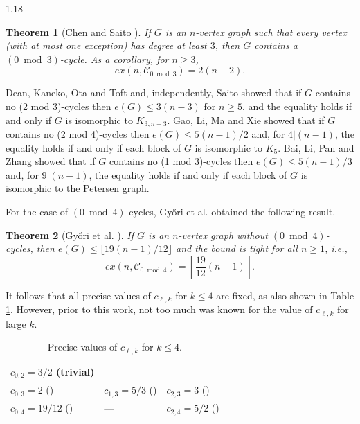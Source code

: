 \documentclass[10pt]{article}
\newtheorem{theorem}{Theorem}[section]
\begin{document}
\begin{spacing}{1.18}
\begin{theorem}[Chen and Saito \cite{CS94}]\label{thm: 0 mod 3}
   If $G$ is an $n$-vertex graph such that every vertex (with at most one exception) has degree at least $3$, then $G$ contains a $(0\bmod 3)$-cycle. As a corollary, for $n \geqslant 3$,
   \[
   ex(n,\mathcal{C}_{0\bmod 3})=2(n-2).
   \]
\end{theorem}

    Dean, Kaneko, Ota and Toft \cite{D+91} and, independently, Saito \cite{Sai92} showed that if $G$ contains no (2 mod 3)-cycles then $e(G)\leqslant 3(n-3)$ for $n\geqslant 5$, and the equality holds if and only if $G$ is isomorphic to $K_{3,n-3}$. Gao, Li, Ma and Xie \cite{GLMX} showed that if $G$ contains no (2 mod 4)-cycles then $e(G)\leqslant 5(n-1)/2$ and, for $4|(n-1)$, the equality holds if and only if each block of $G$ is isomorphic to $K_5$. Bai, Li, Pan and Zhang \cite{B+25} showed that if $G$ contains no (1 mod 3)-cycles then $e(G)\leqslant 5(n-1)/3$ and, for $9|(n-1)$, the equality holds if and only if each block of $G$ is isomorphic to the Petersen graph.

    For the case of $(0\bmod 4)$-cycles, Gy\H{o}ri et al. \cite{G+23} obtained the following result.  

\begin{theorem}[Gy\H{o}ri et al. \cite{G+23}]\label{thm: 0 mod 4}
    If $G$ is an $n$-vertex graph without $(0 \bmod 4)$-cycles, then $e(G)\leqslant \lfloor19(n-1)/12\rfloor$ and the bound is tight for all $n\geqslant 1$, i.e., 
    \[
     ex(n,\mathcal{C}_{0\bmod 4})=\left\lfloor\frac{19}{12}(n-1)\right\rfloor.
    \]  
\end{theorem}

It follows that all precise values of $c_{\ell,k}$ for $k\leqslant 4$ are fixed, as also shown in Table \ref{tab:clk}. However, prior to this work, not too much was known for the value of $c_{\ell,k}$ for large $k$. 

\begin{table}[ht]
    \renewcommand{\arraystretch}{1.5}
	\centering
	\begin{tabular}{l|l|l}
		\hline \hline
		$c_{0,2}=3/2$ (trivial)                   & ---                        & ---                                              \\ \hline
		$c_{0,3}=2$ (\cite{CS94})             & $c_{1,3}=5/3$ (\cite{B+25}) & $c_{2,3}=3$ (\cite{D+91,Sai92}) \\ \hline
		$c_{0,4}=19/12$ (\cite{G+23}) & ---                                      & $c_{2,4}=5/2$ (\cite{GLMX})       \\ \hline \hline
	\end{tabular}
	\caption{Precise values of $c_{\ell,k}$ for $k\leqslant 4$.}
	\label{tab:clk}
\end{table}


\end{spacing}
\end{document}
